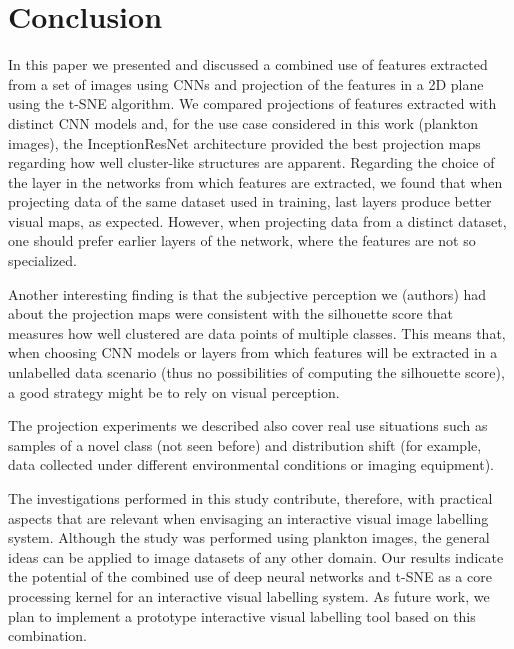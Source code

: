 \documentclass[sn-basic]{sn-jnl}%
\theoremstyle{thmstyleone}%
\theoremstyle{thmstyletwo}%
\theoremstyle{thmstylethree}%
\begin{document}
\section{Conclusion}

In this paper we presented and discussed a combined use of features extracted from a set of images using CNNs and projection of the features in a 2D plane using the t-SNE algorithm. We compared projections of features extracted with distinct CNN models and, for the use case considered in this work (plankton images), the InceptionResNet architecture provided the best projection maps regarding how well cluster-like structures are apparent. Regarding the choice of the layer in the networks from which features are extracted, we found that when projecting data of the same dataset used in training, last layers produce better visual maps, as expected. However, when projecting data from a distinct dataset, one should prefer earlier layers of the network, where the features are not so specialized.

Another interesting finding is that the subjective perception we (authors) had about the projection maps were consistent with the silhouette score that measures how well clustered are data points of multiple classes. This means that, when choosing CNN models or layers from which features will be extracted in a unlabelled data scenario (thus no possibilities of computing the silhouette score), a good strategy might be to rely on visual perception.

The projection experiments we described also cover real use situations such as samples of a novel class (not seen before) and distribution shift (for example, data collected under different environmental conditions or imaging equipment).

The investigations performed in this study contribute, therefore, with practical aspects that are relevant when envisaging an interactive visual image labelling system. Although the study was performed using plankton images, the general ideas can be applied to image datasets of any other domain. Our results indicate the potential of the combined use of deep neural networks and t-SNE as a core processing kernel for an interactive visual labelling system. As future work, we plan to implement a prototype interactive visual labelling tool based on this combination.


\end{document}
